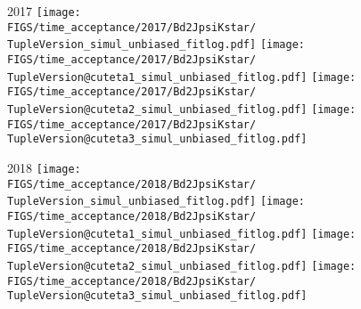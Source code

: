 \begin{frame}
  2017
  \texttt{[image: \\FIGS/time\_acceptance/2017/Bd2JpsiKstar/\\TupleVersion\_simul\_unbiased\_fitlog.pdf]}
  \texttt{[image: \\FIGS/time\_acceptance/2017/Bd2JpsiKstar/\\TupleVersion@cuteta1\_simul\_unbiased\_fitlog.pdf]}
  \texttt{[image: \\FIGS/time\_acceptance/2017/Bd2JpsiKstar/\\TupleVersion@cuteta2\_simul\_unbiased\_fitlog.pdf]}
  \texttt{[image: \\FIGS/time\_acceptance/2017/Bd2JpsiKstar/\\TupleVersion@cuteta3\_simul\_unbiased\_fitlog.pdf]}
  \vspace*{2mm}

  2018
  \texttt{[image: \\FIGS/time\_acceptance/2018/Bd2JpsiKstar/\\TupleVersion\_simul\_unbiased\_fitlog.pdf]}
  \texttt{[image: \\FIGS/time\_acceptance/2018/Bd2JpsiKstar/\\TupleVersion@cuteta1\_simul\_unbiased\_fitlog.pdf]}
  \texttt{[image: \\FIGS/time\_acceptance/2018/Bd2JpsiKstar/\\TupleVersion@cuteta2\_simul\_unbiased\_fitlog.pdf]}
  \texttt{[image: \\FIGS/time\_acceptance/2018/Bd2JpsiKstar/\\TupleVersion@cuteta3\_simul\_unbiased\_fitlog.pdf]}

\end{frame} %



